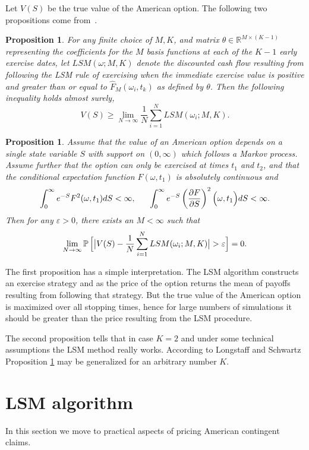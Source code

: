 \documentclass[a4paper,11pt, twoside]{book}
\newtheorem{prop}[thm]{Proposition}
\theoremstyle{definition}
\theoremstyle{remark}
\def\P{{\mathbb{P}}\,}
\def\bpipe{{\bigl|\bigr.}}
\begin{document}
Let $V(S)$ be the true value of the American option. The following two propositions come from~\cite{l-sch}.
\begin{prop}
 For any finite choice of $M, K$, and matrix $\theta \in \mathbb{R}^{M \times (K-1)}$ representing the coefficients for the $M$ basis functions at each of the $K-1$ early exercise dates, let $LSM(\omega; M, K)$ denote the discounted cash flow resulting from following the LSM rule of exercising when the immediate exercise value is positive and greater than or equal to $\hat{F}_M(\omega_i, t_k)$ as defined by $\theta$. Then the following inequality holds almost surely,
 \[ V(S) \geq \lim_{N \rightarrow \infty} \frac{1}{N} \sum\limits_{i=1}^N LSM(\omega_i; M, K). \]
\end{prop}
\begin{prop}
\label{prop:lsmWorks}
 Assume that the value of an American option depends on a single state variable $S$ with support on $(0, \infty)$ which follows a Markov process. Assume further that the option can only be exercised at times $t_1$ and $t_2$, and that the conditional expectation function $F(\omega, t_1)$ is absolutely continuous and
 \[ \int_0^\infty e^{-S} F^2(\omega, t_1) dS < \infty,\ \ \ \ \  \int_0^\infty e^{-S} \left(\frac{\partial F}{\partial S}\right)^2 \Bigl(\omega, t_1\Bigr) dS < \infty. \]
 Then for any $\varepsilon > 0$, there exists an $M < \infty$ such that
 \[ \lim_{N \rightarrow \infty} \P \Bigl[\bpipe V(S) - \frac{1}{N} \sum\limits_{i=1}^N LSM(\omega_i; M, K) \bpipe > \varepsilon \Bigr] = 0. \]
\end{prop}

The first proposition has a simple interpretation. The LSM algorithm constructs an exercise strategy and as the price of the option returns the mean of payoffs resulting from following that strategy. But the true value of the American option is maximized over all stopping times, hence for large numbers of simulations it should be greater than the price resulting from the LSM procedure.

The second proposition tells that in case $K = 2$ and under some technical assumptions the LSM method really works. According to Longstaff and Schwartz Proposition \ref{prop:lsmWorks} may be generalized for an arbitrary number $K$.

\section{LSM algorithm}
In this section we move to practical aspects of pricing American contingent claims.
\end{document}
